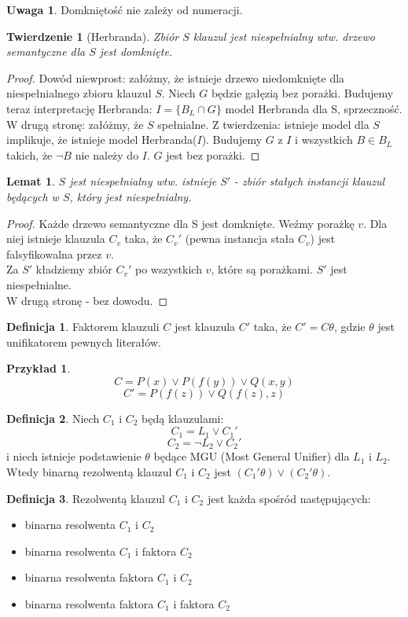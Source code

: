 \documentclass[10pt,a4paper]{article}
\theoremstyle{plain}
\newtheorem{theorem}{Twierdzenie}
\newtheorem{lemma}{Lemat}
\theoremstyle{definition}
\newtheorem*{definition}{Definicja}
\newtheorem*{example}{Przykład}
\newtheorem*{remark}{Uwaga}
\begin{document}
\begin{remark}
 Domkniętość nie zależy od numeracji.
\end{remark}
\begin{theorem}[Herbranda]
 Zbiór $S$ klauzul jest niespełnialny wtw. drzewo semantyczne dla $S$ jest domknięte.
\end{theorem}
\begin{proof}
 Dowód niewprost: załóżmy, że istnieje drzewo niedomknięte dla niespełnialnego zbioru klauzul $S$.
Niech $G$ będzie gałęzią bez porażki.
Budujemy teraz interpretację Herbranda: $I = \{B_L \cap G\}$ model Herbranda dla S, sprzeczność.\\
W drugą stronę: załóżmy, że $S$ spełnialne. Z twierdzenia: istnieje model dla $S$ implikuje,
że istnieje model Herbranda($I$). Budujemy $G$ z $I$ i wszystkich $B \in B_L$ takich,
że $\lnot B$ nie należy do $I$. $G$ jest bez porażki.
\end{proof}
\begin{lemma}
 $S$ jest niespełnialny wtw. istnieje $S'$ - zbiór stałych instancji klauzul będących w $S$,
który jest niespełnialny.
\end{lemma}
\begin{proof}
 Każde drzewo semantyczne dla S jest domknięte. Weźmy porażkę $v$. Dla niej istnieje klauzula $C_v$
taka, że $C_v'$ (pewna instancja stała $C_v$) jest falsyfikowalna przez $v$.\\
Za $S'$ kładziemy zbiór $C_v'$ po wszystkich $v$, które są porażkami. $S'$ jest niespełnialne.\\
W drugą stronę - bez dowodu.
\end{proof}
\begin{definition}
Faktorem klauzuli $C$ jest klauzula $C'$ taka, że $C' = C \theta$, gdzie $\theta$ jest unifikatorem pewnych literałów.
\end{definition}
\begin{example}
$$C = P(x) \vee P(f(y)) \vee Q(x,y)$$
$$C' = P(f(z)) \vee Q(f(z),z)$$
\end{example}
\begin{definition}
Niech $C_1$ i $C_2$ będą klauzulami:
$$C_1 = L_1 \vee C_1'$$
$$C_2 = \lnot L_2 \vee C_2'$$
i niech istnieje podstawienie $\theta$ będące MGU (Most General Unifier) dla $L_1$ i $L_2$.
Wtedy binarną rezolwentą klauzul $C_1$ i $C_2$ jest $(C_1' \theta) \vee (C_2' \theta)$.
\end{definition}
\begin{definition}
 Rezolwentą klauzul $C_1$ i $C_2$ jest każda spośród następujących:
\begin{itemize}
 \item binarna resolwenta $C_1$ i $C_2$
 \item binarna resolwenta $C_1$ i faktora $C_2$
 \item binarna resolwenta faktora $C_1$ i $C_2$
 \item binarna resolwenta faktora $C_1$ i faktora $C_2$
\end{itemize}
\end{definition}
\end{document}

